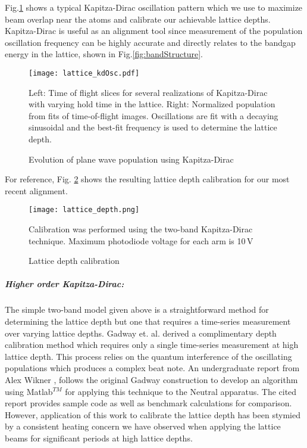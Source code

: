 Fig.\;\ref{fig:KDoscillations} shows a typical Kapitza-Dirac oscillation pattern which we use to maximize beam overlap near the atoms and calibrate our achievable lattice depths. 
Kapitza-Dirac is useful as an alignment tool since measurement of the population oscillation frequency can be highly accurate and directly relates to the bandgap energy in the lattice, shown in Fig.\;\ref{fig:bandStructure}. 
\begin{figure}
	\texttt{[image: lattice\_kdOsc.pdf]}
	\caption{Evolution of plane wave population using Kapitza-Dirac}{Left: Time of flight slices for several realizations of Kapitza-Dirac with varying hold time in the lattice. Right: Normalized population from fits of time-of-flight images. Oscillations are fit with a decaying sinusoidal and the best-fit frequency is used to determine the lattice depth.}
	 \label{fig:KDoscillations}
\end{figure}
For reference, Fig. \ref{fig:latDepth} shows the resulting lattice depth calibration for our most recent alignment.
	\begin{figure} 
		\centerline{
		\texttt{[image: lattice\_depth.png]}}
		\caption{Lattice depth calibration}{Calibration was performed using the two-band Kapitza-Dirac technique. Maximum photodiode voltage for each arm is 10\,V}
		\label{fig:latDepth}
	\end{figure}
	
\subparagraph{Higher order Kapitza-Dirac:}
The simple two-band model given above is a straightforward method for determining the lattice depth but one that requires a time-series measurement over varying lattice depths.
Gadway et. al. \cite{Gadway2009} derived a complimentary depth calibration method which requires only a single time-series measurement at high lattice depth.
This process relies on the quantum interference of the oscillating populations which produces a complex beat note.
An undergraduate report from Alex Wikner \cite{Wikner2017}, follows the original Gadway construction to develop an algorithm using Matlab$^{TM}$ for applying this technique to the Neutral apparatus.
The cited report provides sample code as well as benchmark calculations for comparison.
However, application of this work to calibrate the lattice depth has been stymied by a consistent heating concern we have observed when applying the lattice beams for significant periods at high lattice depths.

